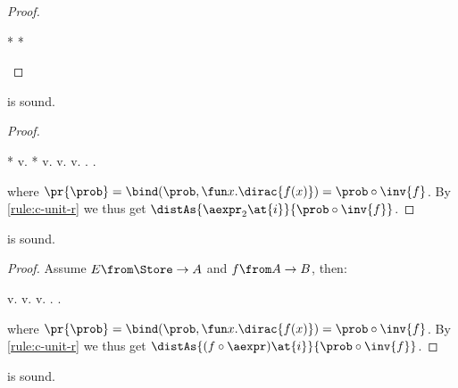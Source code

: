 \begin{proof}
\begin{eqexplain}
  *
\whichproves*
  *
\whichproves
  \land
\whichproves
\whichproves
\qedhere
\end{eqexplain}
\end{proof} \begin{lemma}
\label{proof:sure-sub}
   is sound.
\end{lemma}

\begin{proof}
  \begin{eqexplain}
    *
  \whichproves*
    \CC\prob v.
      *
\whichproves
    \CC\prob v.
\whichproves
    \CC\prob v. 
\whichproves
    \CC\prob v.  .
\whichproves
    \CC{\pr{\prob}} .
  \end{eqexplain}
  where $\pr{\prob} = \bind(\prob, \fun x. \dirac{f(x)}) = \prob \circ \inv{f}$.
  By \ref{rule:c-unit-r} we thus get
  $\distAs{\aexpr_2\at{i}}{\prob \circ \inv{f}}$.
\end{proof} \begin{lemma}
\label{proof:dist-fun}
   is sound.
\end{lemma}

\begin{proof}
  Assume $E\from \Store \to A$ and $ f \from A \to B $, then:
  \begin{eqexplain}
\whichproves*
      \CC\prob v. 
\whichproves
      \CC\prob v. 
\whichproves
      \CC\prob v.  .
\whichproves
      \CC{\pr{\prob}} .
  \end{eqexplain}
  where $\pr{\prob} = \bind(\prob, \fun x. \dirac{f(x)}) = \prob \circ \inv{f}$.
  By \ref{rule:c-unit-r} we thus get
  $\distAs{(f\circ\aexpr)\at{i}}{\prob \circ \inv{f}}$.
\end{proof} \begin{lemma}
\label{proof:dirac-dup}
   is sound.
\end{lemma}

